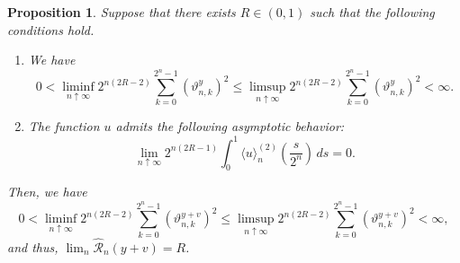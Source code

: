 \documentclass[12pt,reqno]{article}
\def\ua{\uparrow}
\def\wh{\widehat}
\numberwithin{equation}{section}
\def\cR{{\mathscr R}}
\newtheorem{proposition}[theorem]{Proposition}
\theoremstyle{definition}
\def\<{\langle}
\def\>{\rangle}
\def\ua{\uparrow}
\def\wh{\widehat}
\newcommand{\bR}{\mathbb{R}}
\newcommand{\bN}{\mathbb{N}}
\newcommand{\bP}{\mathbb{P}}
\begin{document}
\begin{proposition}\label{lemma add}
	Suppose that there exists $R \in (0,1)$ such that the following conditions hold.
	\begin{enumerate}
		\item \label{item a lemma add} We have 
		\begin{equation}\label{eq y vartheta}
			0 < \liminf_{n \ua \infty} 2^{n(2R-2)} \sum_{k = 0}^{2^n-1} \left(\vartheta^y_{n,k}\right)^2 \le \limsup_{n \ua \infty} 2^{n(2R-2)} \sum_{k = 0}^{2^n-1} \left(\vartheta^y_{n,k}\right)^2 < \infty.
		\end{equation}
		\item \label{item b lemma add}The function $u$ admits the following asymptotic behavior:  
		\begin{equation}\label{eq u QV}
			\lim_{n \ua \infty} 2^{n(2R-1)}\int_0^{1}\<u\>^{(2)}_n\left(\frac{s}{2^n}\right)\,ds= 0.
		\end{equation}
	\end{enumerate}
	Then, we have
	\begin{equation}\label{eq target vartheta}
		0 < \liminf_{n \ua \infty} 2^{n(2R-2)} \sum_{k = 0}^{2^n-1} \left(\vartheta^{y + v}_{n,k}\right)^2 \le \limsup_{n \ua \infty} 2^{n(2R-2)} \sum_{k = 0}^{2^n-1} \left(\vartheta^{y+v}_{n,k}\right)^2 < \infty,
	\end{equation}
	and thus, $\lim_n \wh \cR_n(y+v) = R$. 
\end{proposition}


%
\end{document}
